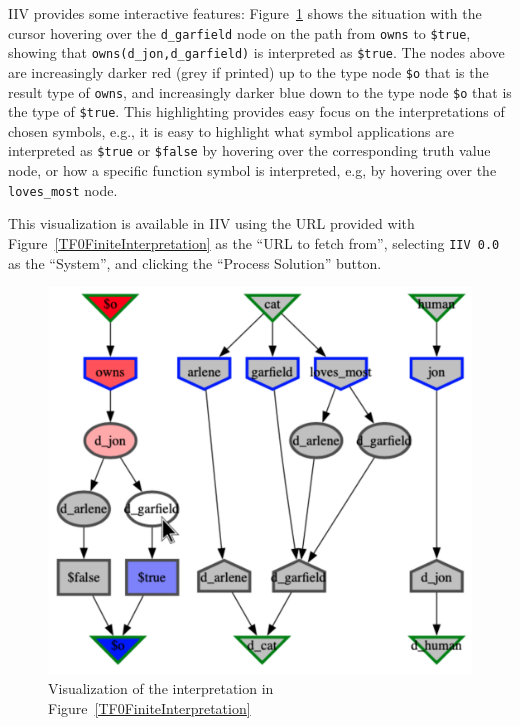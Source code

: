 \documentclass[letterpaper]{article}
\newcommand{\smalltt}[1]{\small \texttt{#1}}
\begin{document}
{IIV provides some interactive features: Figure~\ref{TF0FiniteIIV} shows the situation with the 
cursor hovering over the {\smalltt{d\_garfield}} node on the path from {\smalltt{owns}} to 
{\smalltt{\$true}}, showing that {\smalltt{owns(d\_jon,d\_garfield)}} is interpreted as 
{\smalltt{\$true}}.
The nodes above are increasingly darker red (grey if printed) up to the type node {\smalltt{\$o}} 
that is the result type of {\smalltt{owns}}, and increasingly darker blue down to the type node 
{\smalltt{\$o}} that is the type of {\smalltt{\$true}}.
This highlighting provides easy focus on the interpretations of chosen symbols, e.g., it is easy
to highlight what symbol applications are interpreted as {\smalltt{\$true}} or {\smalltt{\$false}}
by hovering over the corresponding truth value node, or how a specific function symbol is 
interpreted, e.g, by hovering over the {\smalltt{loves\_most}} node.

This visualization is available in IIV using the URL provided with 
Figure~\ref{TF0FiniteInterpretation} as the ``URL to fetch from'',
selecting {\tt IIV 0.0} as the ``System'', and clicking the ``Process Solution'' button.

\begin{figure}[htbp]
\centering
\includegraphics[width=\columnwidth]{IIVGraph.pdf}
\caption{Visualization of the interpretation in Figure~\ref{TF0FiniteInterpretation}}
\label{TF0FiniteIIV}
\end{figure}

}
\end{document}
